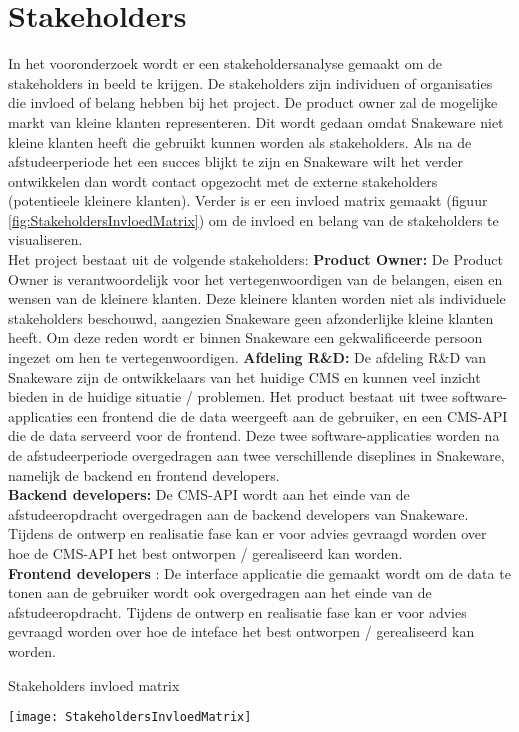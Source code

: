 \section{Stakeholders}
In het vooronderzoek wordt er een stakeholdersanalyse gemaakt om de stakeholders in beeld te krijgen.
De stakeholders zijn individuen of organisaties die invloed of belang hebben bij het project.
De product owner zal de mogelijke markt van kleine klanten representeren.
Dit wordt gedaan omdat Snakeware niet kleine klanten heeft die gebruikt kunnen worden als stakeholders.
Als na de afstudeerperiode het een succes blijkt te zijn en Snakeware wilt het verder ontwikkelen dan wordt contact opgezocht met de externe stakeholders (potentieele kleinere klanten). 
Verder is er een invloed matrix gemaakt (figuur \ref{fig:StakeholdersInvloedMatrix}) om de invloed en belang van de stakeholders te visualiseren. \\
Het project bestaat uit de volgende stakeholders:
\whitespace
\textbf{Product Owner:}
De Product Owner is verantwoordelijk voor het vertegenwoordigen van de belangen, eisen en wensen van de kleinere klanten.
Deze kleinere klanten worden niet als individuele stakeholders beschouwd, aangezien Snakeware geen afzonderlijke kleine klanten heeft.
Om deze reden wordt er binnen Snakeware een gekwalificeerde persoon ingezet om hen te vertegenwoordigen.
\whitespace
\textbf{Afdeling R\&D:} De afdeling R\&D van Snakeware zijn de ontwikkelaars van het huidige \gls{CMS} en kunnen veel inzicht bieden in de huidige situatie / problemen.
\whitespace
Het product bestaat uit twee software-applicaties een frontend die de data weergeeft aan de gebruiker, en een \gls{CMS}-API die de data serveerd voor de frontend.
Deze twee software-applicaties worden na de afstudeerperiode overgedragen aan twee verschillende diseplines in Snakeware, namelijk de backend en frontend developers.
\\
\textbf{Backend developers:} De \gls{CMS}-API wordt aan het einde van de afstudeeropdracht overgedragen aan de backend developers van Snakeware.
Tijdens de ontwerp en realisatie fase kan er voor advies gevraagd worden over hoe de \gls{CMS}-API het best ontworpen / gerealiseerd kan worden. \\
\textbf{Frontend developers} : De interface applicatie die gemaakt wordt om de data te tonen aan de gebruiker wordt ook overgedragen aan het einde van de afstudeeropdracht.
Tijdens de ontwerp en realisatie fase kan er voor advies gevraagd worden over hoe de inteface het best ontworpen / gerealiseerd kan worden.
\begin{graphic}
    \captionsetup{type=figure}
    \caption{Stakeholders invloed matrix}
    \texttt{[image: StakeholdersInvloedMatrix]}
    \label{fig:StakeholdersInvloedMatrix}
\end{graphic}

